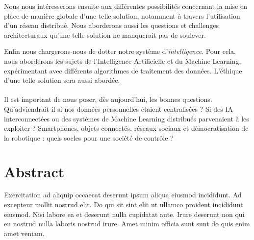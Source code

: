 Nous nous intéresserons ensuite aux différentes possibilités concernant la mise en place 
de manière globale d'une telle solution, notamment à travers l'utilisation d'un réseau
distribué. Nous aborderons aussi les questions et challenges architecturaux qu'une telle 
solution ne manquerait pas de soulever.

Enfin nous chargerons-nous de dotter notre système d'\emph{intelligence}. Pour cela, nous
aborderons les sujets de l'Intelligence Artificielle et du Machine Learning, expérimentant
avec différents algorithmes de traitement des données. L'éthique d'une telle solution sera
aussi abordée.

\paragraph{} Il est important de nous poser, dès aujourd'hui, les bonnes questions.\\
Qu'adviendrait-il si nos données personnelles étaient centralisées ? Si des IA interconnectées
ou des systèmes de Machine Learning distribués parvenaient à les exploiter ? Smartphones,
objets connectés, réseaux sociaux et démocratisation de la robotique : quels socles pour une
société de contrôle ?




\section*{Abstract}
Exercitation ad aliquip occaecat deserunt ipsum aliqua eiusmod incididunt. Ad excepteur mollit nostrud elit. Do qui sit sint elit ut ullamco proident incididunt eiusmod. Nisi labore ea et deserunt nulla cupidatat aute. Irure deserunt non qui eu nostrud nulla laboris nostrud irure. Amet minim officia sunt sunt do quis enim amet veniam.
